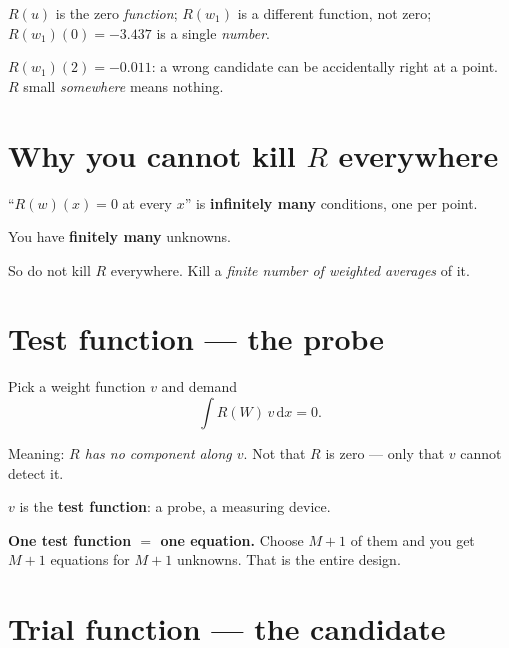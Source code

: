 \documentclass[11pt]{article}
\newcommand{\dx}{\,\mathrm{d}x}
\begin{document}
\begin{pts}
\item $R(u)$ is the zero \emph{function}; $R(w_1)$ is a different function,
      not zero; $R(w_1)(0)=-3.437$ is a single \emph{number}.
\item $R(w_1)(2)=-0.011$: a wrong candidate can be accidentally right at a
      point. $R$ small \emph{somewhere} means nothing.
\end{pts}

\section{Why you cannot kill $R$ everywhere}

\begin{pts}
\item ``$R(w)(x)=0$ at every $x$'' is \textbf{infinitely many} conditions, one
      per point.
\item You have \textbf{finitely many} unknowns.
\item So do not kill $R$ everywhere. Kill a \emph{finite number of weighted
      averages} of it.
\end{pts}

\section{Test function --- the probe}

Pick a weight function $v$ and demand
\[
  \int R(W)\,v\dx = 0 .
\]

\begin{pts}
\item Meaning: \emph{$R$ has no component along $v$}. Not that $R$ is zero ---
      only that $v$ cannot detect it.
\item $v$ is the \textbf{test function}: a probe, a measuring device.
\item \textbf{One test function $=$ one equation.} Choose $M+1$ of them and you
      get $M+1$ equations for $M+1$ unknowns. That is the entire design.
\end{pts}

\section{Trial function --- the candidate}
\end{document}
